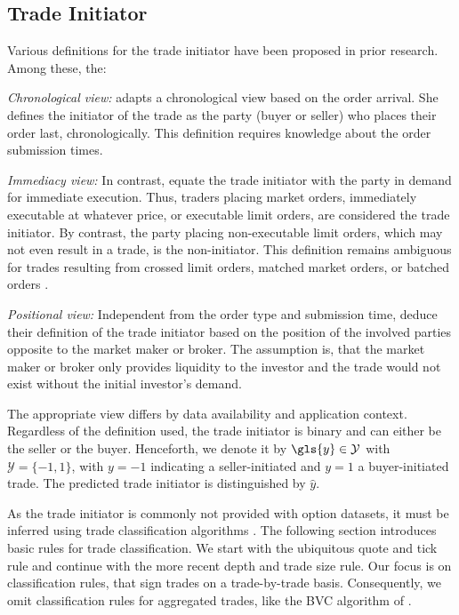 \subsection{Trade Initiator}
\label{sec:trade-initiator}

Various definitions for the trade initiator have been proposed in prior
research. Among these, the:

\emph{Chronological view:} \textcite[][267]{odders-whiteOccurrenceConsequencesInaccurate2000} adapts a chronological view based on the order arrival. She defines the initiator of the trade as the party (buyer or seller) who places their order last, chronologically. This definition requires knowledge about the order submission times.

\emph{Immediacy view:} In contrast, \textcite[][94--97]{leeInferringInvestorBehavior2000} equate the trade initiator with the party in demand for immediate execution. Thus, traders placing market orders, immediately executable at whatever price, or executable limit orders, are considered the trade initiator. By contrast, the party placing non-executable limit orders, which may not even result in a trade, is the non-initiator. This definition remains ambiguous for trades resulting from crossed limit orders, matched market orders, or batched orders \autocite[][94--95]{leeInferringInvestorBehavior2000}.

\emph{Positional view:} Independent from the order type and submission time, \textcite[][533]{ellisAccuracyTradeClassification2000} deduce their definition of the trade initiator based on the position of the involved parties opposite to the market maker or broker. The assumption is, that the market maker or broker only provides liquidity to the investor and the trade would not exist without the initial investor's demand.

The appropriate view differs by data availability and application context.
Regardless of the definition used, the trade initiator is binary and can either be the seller or the buyer. Henceforth, we denote it by $\gls{y} \in \mathcal{Y}$ with $\mathcal{Y}=\{-1,1\}$, with $y=-1$ indicating a seller-initiated and $y=1$ a buyer-initiated trade. The predicted trade initiator is distinguished by $\hat{y}$.

As the trade initiator is commonly not provided with option datasets, it must be inferred using trade classification algorithms \autocite[][453]{easleyOptionVolumeStock1998}. The following section introduces basic rules for trade classification. We start with the ubiquitous quote and tick rule and continue with the more recent depth and trade size rule. Our focus is on classification rules, that sign trades on a trade-by-trade basis. Consequently, we omit classification rules for aggregated trades, like the \gls{BVC} algorithm of \textcite[][1466--1468]{easleyFlowToxicityLiquidity2012}.

